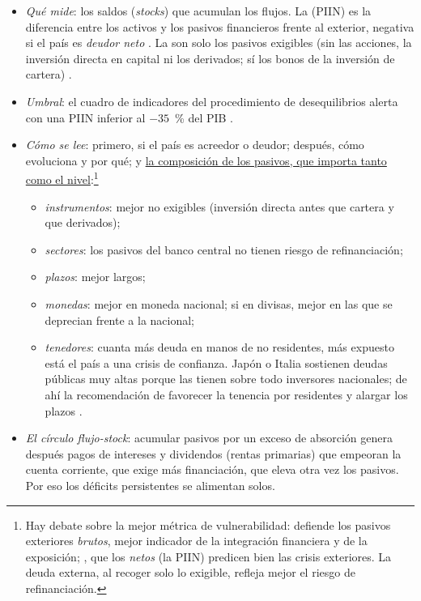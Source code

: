 \documentclass[11pt]{article}
\begin{document}
\begin{itemize}
\item \emph{Qué mide}: los saldos (\emph{stocks}) que acumulan los flujos. La  (PIIN) es la diferencia entre los activos y los pasivos financieros frente al exterior,
negativa si el país es \emph{deudor neto} \parencite{FMI2009MBP6}. La  son solo los pasivos exigibles (sin las acciones, la inversión directa en capital ni los derivados; sí los bonos de la inversión de cartera) .
\item \emph{Umbral}: el cuadro de indicadores del procedimiento de desequilibrios alerta con una PIIN inferior al $-35$~\% del PIB \parencite{CE2025AMR2026}.
\item \emph{Cómo se lee}: primero, si el país es acreedor o deudor; después, cómo evoluciona y por qué; y \uline{la composición de los pasivos, que importa tanto como el nivel}:\footnote{Hay debate sobre la mejor métrica de vulnerabilidad: \textcite{Shin2012} defiende los pasivos exteriores \emph{brutos}, mejor indicador de la integración financiera y de la exposición; \textcite{CataoMilesiFerretti2014}, que los \emph{netos} (la PIIN) predicen bien las crisis exteriores. La deuda externa, al recoger solo lo exigible, refleja mejor el riesgo de refinanciación.}
  \begin{itemize}
  \item \emph{instrumentos}: mejor no exigibles (inversión directa antes que cartera y que derivados);
  \item \emph{sectores}: los pasivos del banco central no tienen riesgo de refinanciación;
  \item \emph{plazos}: mejor largos;
  \item \emph{monedas}: mejor en moneda nacional; si en divisas, mejor en las que se deprecian frente a la nacional;
  \item \emph{tenedores}: cuanta más deuda en manos de no residentes, más expuesto está el país a una crisis de confianza. Japón o Italia sostienen deudas públicas muy altas porque las tienen sobre todo inversores nacionales; de ahí la recomendación de favorecer la tenencia por residentes y alargar los plazos \parencite{ArslanalpTsuda2014}.
  \end{itemize}
\item \emph{El círculo flujo-stock}: acumular pasivos por un exceso de absorción genera después pagos de intereses y dividendos (rentas primarias) que empeoran la cuenta corriente, que exige más financiación, que eleva otra vez los pasivos. Por eso los déficits persistentes se alimentan solos.
\end{itemize}
\end{document}
